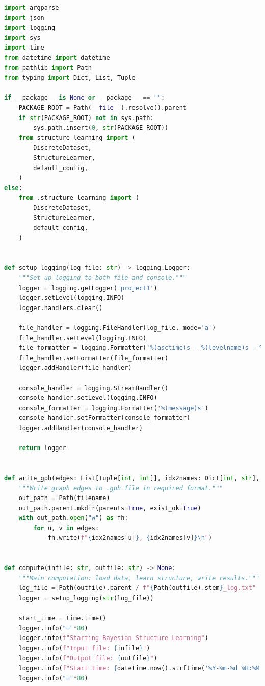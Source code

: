 \documentclass[twoside,11pt]{article}
\begin{document}
\begin{algorithm}
\begin{lstlisting}[language=Python, basicstyle=\tiny\ttfamily, breaklines=true, columns=flexible]
import argparse
import json
import logging
import sys
import time
from datetime import datetime
from pathlib import Path
from typing import Dict, List, Tuple

if __package__ is None or __package__ == "":
    PACKAGE_ROOT = Path(__file__).resolve().parent
    if str(PACKAGE_ROOT) not in sys.path:
        sys.path.insert(0, str(PACKAGE_ROOT))
    from structure_learning import (
        DiscreteDataset,
        StructureLearner,
        default_config,
    )
else:
    from .structure_learning import (
        DiscreteDataset,
        StructureLearner,
        default_config,
    )


def setup_logging(log_file: str) -> logging.Logger:
    """Set up logging to both file and console."""
    logger = logging.getLogger('project1')
    logger.setLevel(logging.INFO)
    logger.handlers.clear()

    file_handler = logging.FileHandler(log_file, mode='a')
    file_handler.setLevel(logging.INFO)
    file_formatter = logging.Formatter('%(asctime)s - %(levelname)s - %(message)s')
    file_handler.setFormatter(file_formatter)
    logger.addHandler(file_handler)

    console_handler = logging.StreamHandler()
    console_handler.setLevel(logging.INFO)
    console_formatter = logging.Formatter('%(message)s')
    console_handler.setFormatter(console_formatter)
    logger.addHandler(console_handler)

    return logger


def write_gph(edges: List[Tuple[int, int]], idx2names: Dict[int, str], filename: str) -> None:
    """Write graph edges to .gph file in required format."""
    out_path = Path(filename)
    out_path.parent.mkdir(parents=True, exist_ok=True)
    with out_path.open("w") as fh:
        for u, v in edges:
            fh.write(f"{idx2names[u]}, {idx2names[v]}\n")


def compute(infile: str, outfile: str) -> None:
    """Main computation: load data, learn structure, write results."""
    log_file = Path(outfile).parent / f"{Path(outfile).stem}_log.txt"
    logger = setup_logging(str(log_file))

    start_time = time.time()
    logger.info("="*80)
    logger.info(f"Starting Bayesian Structure Learning")
    logger.info(f"Input file: {infile}")
    logger.info(f"Output file: {outfile}")
    logger.info(f"Start time: {datetime.now().strftime('%Y-%m-%d %H:%M:%S')}")
    logger.info("="*80)


\end{lstlisting}
\end{algorithm}
\end{document}
